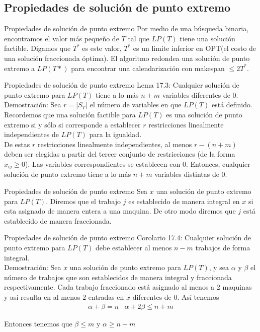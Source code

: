 \renewcommand{\subsectiontitle}{Propiedades de solución de punto extremo}
\subsection{\subsectiontitle}

\begin{frame}{\subsectiontitle}
Por medio de una búsqueda binaria, encontramos el valor más pequeño de $T$ tal que $LP(T)$ tiene una solución factible. Digamos que $T^*$ es este valor, $T^*$ es un limite inferior en OPT(el costo de una solución fraccionada óptima). El algoritmo redondea una solución de punto extremo a $LP(T*)$ para encontrar una calendarización con makespan $\leq 2T^*$.
\end{frame}

\begin{frame}{\subsectiontitle}
Lema 17.3: Cualquier solución de punto extremo para $LP(T)$ tiene a lo más $n+m$ variables diferentes de 0.\\

\vspace{10pt}
Demostración: Sea $r=|S_T|$ el número de variables en que $LP(T)$ está definido. Recordemos que una solución factible para $LP(T)$ es una solución de punto extremo si y sólo si corresponde a establecer $r$ restricciones linealmente independientes de $LP(T)$ para la igualdad.\\

\vspace{5pt}
De estas $r$ restricciones linealmente independientes, al menos $r-(n+m)$ deben ser elegidas a partir del tercer conjunto de restricciones (de la forma $x_{ij}\geq 0$). Las variables correspondientes se establecen con 0. Entonces, cualquier solución de punto extremo tiene a lo más $n+m$ variables distintas de 0.
\end{frame}

\begin{frame}{\subsectiontitle}
Sea $x$ una solución de punto extremo para $LP(T)$. Diremos que el trabajo $j$ es establecido de manera integral en $x$ si esta asignado de manera entera a una maquina. De otro modo diremos que $j$ está establecido de manera fraccionada.
\end{frame}

\begin{frame}{\subsectiontitle}
Corolario 17.4: Cualquier solución de punto extremo para $LP(T)$ debe establecer al menos $n-m$ trabajos de forma integral.\\

\vspace{10pt}
Demostración: Sea $x$ una solución de punto extremo para $LP(T)$, y sea $\alpha$ y $\beta$ el número de trabajos que son establecidos de manera integral y fraccionada respectivamente. Cada trabajo fraccionado está asignado al menos a 2 maquinas y así resulta en al menos 2 entradas en $x$ diferentes de 0. Así tenemos 
\begin{align*}
    \alpha + \beta = n &\alpha+2\beta \leq n+m
\end{align*}

Entonces tenemos que $\beta \leq m$ y $\alpha \geq n-m$
\end{frame}


